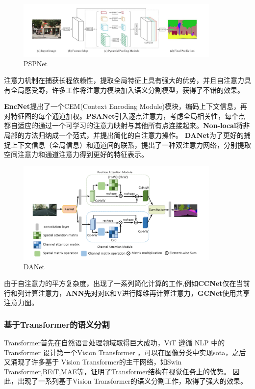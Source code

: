 \documentclass[11pt]{article}
\begin{document}
\begin{figure}[H]
    \centering
    \includegraphics[width=10cm]{fig5.jpg}
    \caption{PSPNet\cite{2016Pyramid}}
\end{figure}

注意力机制在捕获长程依赖性，提取全局特征上具有强大的优势，并且自注意力具有全局感受野，许多工作将注意力模块加入语义分割模型，获得了不错的效果。

\textbf{EncNet}\cite{enc}提出了一个CEM(Context Encoding Module)模块，编码上下文信息，再对特征图的每个通道加权。\textbf{PSANet}\cite{psa}引入逐点注意力，考虑全局相关性，每个点都自适应的通过一个可学习的注意力映射与其他所有点连接起来。\textbf{Non-local}\cite{non}将非局部的方法归纳成一个范式，并提出简化的自注意力操作。
\textbf{DANet}\cite{dan}为了更好的捕捉上下文信息（全局信息）和通道间的联系，提出了一种双注意力网络，分别提取空间注意力和通道注意力得到更好的特征表示。

\begin{figure}[H]
    \centering
    \includegraphics[width=10cm]{dan.png}
    \caption{DANet\cite{dan}}
\end{figure}

由于自注意力的平方复杂度，出现了一系列简化计算的工作,例如\textbf{CCNet}\cite{ccn}仅在当前行和列计算注意力，\textbf{ANN}\cite{ann}先对对K和V进行降维再计算注意力，\textbf{GCNet}\cite{gcn}使用共享注意力图。

\subsubsection{基于Transformer的语义分割}
Transformer首先在自然语言处理领域取得巨大成功\cite{trans}，ViT\cite{vit} 遵循 NLP 中的 Transformer 设计第一个Vision Transformer ，可以在图像分类中实现sota，之后又涌现了许多基于 Vision Transformer的主干网络，如Swin Transformer\cite{swi},BEiT\cite{bei},MAE\cite{mae}等，证明了Transformer结构在视觉任务上的优势。
因此，出现了一系列基于Vision Transformer的语义分割工作，取得了强大的效果。
\end{document}
